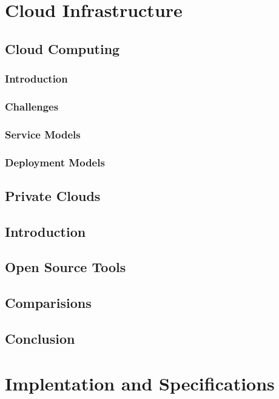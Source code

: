 \documentclass[12pt]{report}
\begin{document}
\chapter{Cloud Infrastructure}

\section{Cloud Computing}

\subsection{Introduction}

\subsection{Challenges}

\subsection{Service Models}

\subsection{Deployment Models}

\section{Private Clouds}

\section{Introduction}

\section{Open Source Tools}

\section{Comparisions}

\section{Conclusion}
	
\chapter{Implentation and Specifications}
\end{document}
